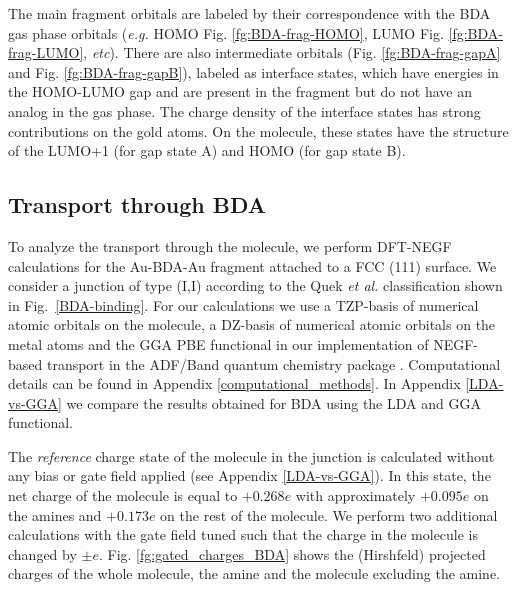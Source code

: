 \documentclass[aip,jcp,a4paper,reprint,floatfix,superscriptaddress]{revtex4-1}
\newcommand{\etal}{\emph{et al.}\xspace}
\newcommand{\eg}{\emph{e.g.}\xspace}
\begin{document}
The main fragment orbitals are labeled by their correspondence with the BDA gas phase orbitals (\eg HOMO Fig. \ref{fg:BDA-frag-HOMO}, LUMO Fig. \ref{fg:BDA-frag-LUMO}, \textit{etc}). There are also intermediate orbitals (Fig. \ref{fg:BDA-frag-gapA} and Fig. \ref{fg:BDA-frag-gapB}), labeled as interface states, which have energies in the HOMO-LUMO gap and are present in the fragment but do not have an analog in the gas phase. The charge density of the interface states has strong contributions on the gold atoms. On the molecule, these states have the structure of the LUMO+1 (for gap state A) and HOMO (for gap state B).


\subsection{Transport through BDA} \label{Sec:TransportBDA}

To analyze the transport through the molecule, we perform DFT-NEGF calculations for the Au-BDA-Au fragment attached to a FCC (111) surface. We consider a junction of type (I,I) according to the Quek \etal classification \cite{Quek2007} shown in Fig.~\ref{BDA-binding}. For our calculations we use a TZP-basis of numerical atomic orbitals on the molecule, a DZ-basis of numerical atomic orbitals on the metal atoms and the GGA PBE functional in our implementation of NEGF-based transport in the ADF/Band quantum chemistry package \cite{Velde1991,Wiesenekker1991,Verzijl2012}. Computational details can be found in Appendix \ref{computational_methods}. In Appendix \ref{LDA-vs-GGA} we compare the results obtained for BDA using the LDA and GGA functional.

The \textit{reference} charge state of the molecule in the junction is calculated without any bias or gate field applied (see Appendix \ref{LDA-vs-GGA}). In this state, the net charge of the molecule is equal to $+0.268e$ with approximately $+0.095e$ on the amines and $+0.173e$ on the rest of the molecule. We perform two additional calculations with the gate field tuned such that the charge in the molecule is changed by $\pm e$. Fig. \ref{fg:gated_charges_BDA} shows the (Hirshfeld) projected charges of the whole molecule, the amine and the molecule excluding the amine.
\end{document}
